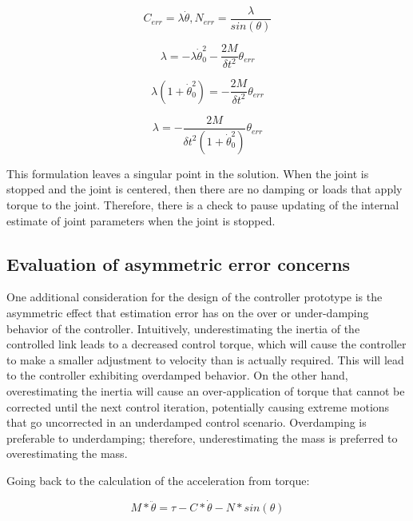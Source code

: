 \begin{equation} \label{eq:find_C}
C_{err} = \lambda \dot{\theta}, N_{err} = \dfrac{\lambda}{sin(\theta)}
\end{equation}

\begin{equation}
\lambda = 
- \lambda \dot{\theta}_{0}^{2}
- \dfrac{2M}{\delta t^{2}} \theta_{err}
\end{equation}

\begin{equation}
\lambda (1
+ \dot{\theta}_{0}^{2})
=
- \dfrac{2M}{\delta t^{2}} \theta_{err}
\end{equation}

\begin{equation} \label{eq:lambda_def}
\lambda 
=
- \dfrac{2M}{\delta t^{2} (1 + \dot{\theta}_{0}^{2})} \theta_{err}
\end{equation}

This formulation leaves a singular point in the solution. When the joint is stopped and the joint is centered, then there are no damping or loads that apply torque to the joint. Therefore, there is a check to pause updating of the internal estimate of joint parameters when the joint is stopped.

\subsection{Evaluation of asymmetric error concerns}

One additional consideration for the design of the controller prototype is the asymmetric
effect that estimation error has on the over or under-damping behavior of the
controller. Intuitively,
underestimating the inertia of the controlled link leads to a decreased control
torque, which will cause the controller to make a smaller adjustment to velocity than is actually required. This will lead to the controller exhibiting overdamped behavior. On the
other hand, overestimating the inertia will cause an over-application of torque
that cannot be corrected until the next control iteration, potentially causing
extreme motions that go uncorrected in an underdamped control scenario. Overdamping is preferable to underdamping; therefore, underestimating the mass is preferred to overestimating the mass.

Going back to the calculation of the acceleration from torque:

\begin{equation} \label{eq:simple_mass_model3}
M * \ddot{\theta} = \tau - C * \dot{\theta} - N * sin(\theta)
\end{equation}

